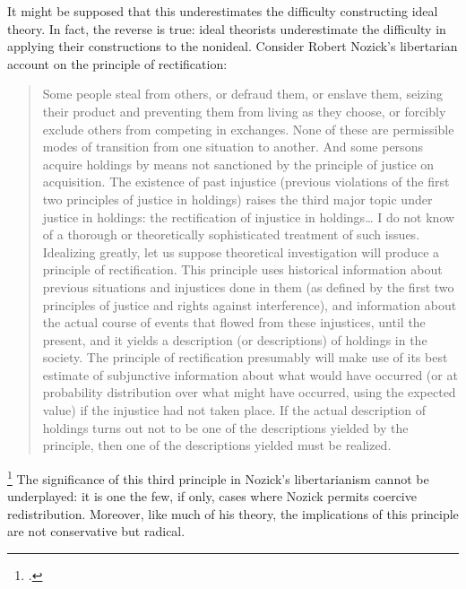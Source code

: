 \documentclass[letterpaper,notitlepage,12pt]{article}
\begin{document}
It might be supposed that this underestimates the difficulty constructing ideal
theory.
In fact, the reverse is true: ideal theorists underestimate the difficulty in
applying their constructions to the nonideal.
Consider Robert Nozick's libertarian account on the principle of
rectification: \blockquote{Some people steal from others, or defraud them, or
  enslave them, seizing their product and preventing them from living as they
  choose, or forcibly exclude others from competing in exchanges. None of these
  are permissible modes of transition from one situation to another. And some
  persons acquire holdings by means not sanctioned by the principle of justice
  on acquisition. The existence of past injustice (previous violations of the
  first two principles of justice in holdings) raises the third major topic
  under justice in holdings: the rectification of injustice in holdings\ldots
  I do not know of a thorough or theoretically sophisticated treatment of such
  issues. Idealizing greatly, let us suppose theoretical investigation will
  produce a principle of rectification. This principle uses historical
  information about previous situations and injustices done in them (as defined
  by the first two principles of justice and rights against interference), and
  information about the actual course of events that flowed from these
  injustices, until the present, and it yields a description (or descriptions)
  of holdings in the society. The principle of rectification presumably will
  make use of its best estimate of subjunctive information about what would have
  occurred (or at probability distribution over what might have occurred, using
  the expected value) if the injustice had not taken place. If the actual
  description of holdings turns out not to be one of the descriptions yielded by
the principle, then one of the descriptions yielded must be
realized.}\footcite[p. 152-53]{nozick_anarchy_2012}
The significance of this third principle in Nozick's libertarianism cannot be
underplayed: it is one the few, if only, cases where Nozick permits coercive
redistribution.
Moreover, like much of his theory, the implications of this principle are not
conservative but radical.
\end{document}
